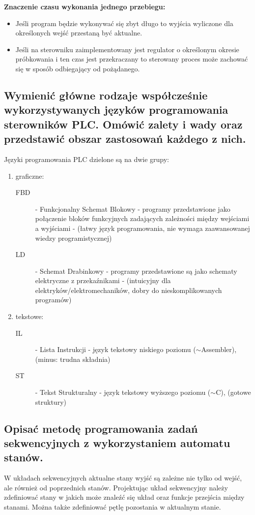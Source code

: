 \textbf{Znaczenie czasu wykonania jednego przebiegu:}
\begin{itemize}
    \item Jeśli program będzie wykonywać się zbyt długo to wyjścia wyliczone dla określonych wejść przestaną być aktualne.
    \item Jeśli na sterowniku zaimplementowany jest regulator o określonym okresie próbkowania i ten czas jest przekraczany to sterowany proces może zachować się w sposób odbiegający od pożądanego.
\end{itemize}

\subsection{Wymienić główne rodzaje współcześnie wykorzystywanych języków programowania sterowników PLC. Omówić zalety i wady oraz przedstawić obszar zastosowań każdego z nich.}

Języki programowania PLC dzielone są na dwie grupy:
\begin{enumerate}
    \item graficzne:
    \begin{description}
        \item[FBD] - Funkcjonalny Schemat Blokowy - programy przedstawione jako połączenie bloków funkcyjnych zadających zależności między wejściami a wyjściami - (łatwy język programowania, nie wymaga zaawansowanej wiedzy programistycznej)
        \item[LD] - Schemat Drabinkowy - programy przedstawione są jako schematy elektryczne z przekaźnikami - (intuicyjny dla elektryków/elektromechaników, dobry do nieskomplikowanych programów)
    \end{description}
    \item tekstowe:
    \begin{description}
        \item[IL] - Lista Instrukcji - język tekstowy niskiego poziomu ($\sim{}$Assembler), (minus: trudna składnia)
        \item[ST] - Tekst Strukturalny - język tekstowy wyższego poziomu ($\sim{}$C), (gotowe struktury)
    \end{description}
\end{enumerate}

\subsection{Opisać metodę programowania zadań sekwencyjnych z wykorzystaniem automatu stanów.}
W układach sekwencyjnych aktualne stany wyjść są zależne nie tylko od wejść, ale również od poprzednich stanów. Projektując układ sekwencyjny należy zdefiniować stany w jakich może znaleźć się układ oraz funkcje przejścia między stanami. Można także zdefiniować pętlę pozostania w aktualnym stanie.

